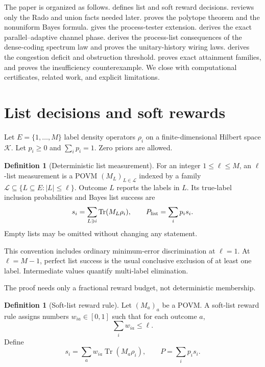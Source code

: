 \documentclass[11pt]{article}
\theoremstyle{definition}
\newtheorem{definition}[theorem]{Definition}
\theoremstyle{remark}
\newcommand{\cK}{\mathcal K}
\newcommand{\cL}{\mathcal L}
\newcommand{\Tr}{\operatorname{Tr}}
\begin{document}
The paper is organized as follows.   defines list and soft
reward decisions.   reviews only the Rado and union facts
needed later.   proves the polytope theorem and the nonuniform
Bayes formula.   gives the process-tester extension.
 derives the exact parallel--adaptive channel phase.
 derives the process-list consequences of the dense-coding
spectrum law and proves the unitary-history wiring laws.
 derives the congestion deficit and obstruction threshold.
 proves exact attainment families, and
 proves the insufficiency counterexample.  We close
with computational certificates, related work, and explicit limitations.

\section{List decisions and soft rewards}\label{sec:model}

Let $E=\{1,\ldots,M\}$ label density operators $\rho_i$ on a
finite-dimensional Hilbert space $\cK$.  Let $p_i\geq0$ and
$\sum_i p_i=1$.  Zero priors are allowed.

\begin{definition}[Deterministic list measurement]
For an integer $1\leq\ell\leq M$, an $\ell$-list measurement is a POVM
$(M_L)_{L\in\cL}$ indexed by a family
$\cL\subseteq\{L\subseteq E:|L|\leq\ell\}$.  Outcome $L$ reports the labels
in $L$.  Its true-label inclusion probabilities and Bayes list success are
\begin{equation}\label{eq:si}
 s_i=\sum_{L\ni i}\Tr(M_L\rho_i),\qquad
 P_{\rm list}=\sum_i p_i s_i.
\end{equation}
Empty lists may be omitted without changing any statement.
\end{definition}

This convention includes ordinary minimum-error discrimination at $\ell=1$.
At $\ell=M-1$, perfect list success is the usual conclusive exclusion of at
least one label.  Intermediate values quantify multi-label elimination.

The proof needs only a fractional reward budget, not deterministic membership.

\begin{definition}[Soft-list reward rule]
Let $(M_a)_a$ be a POVM.  A soft-list reward rule assigns numbers
$w_{ia}\in[0,1]$ such that for each outcome $a$,
\begin{equation}\label{eq:soft-budget}
 \sum_i w_{ia}\leq\ell.
\end{equation}
Define
\begin{equation}\label{eq:soft}
 s_i=\sum_a w_{ia}\Tr(M_a\rho_i),\qquad
 P=\sum_i p_i s_i.
\end{equation}
\end{definition}
\end{document}

